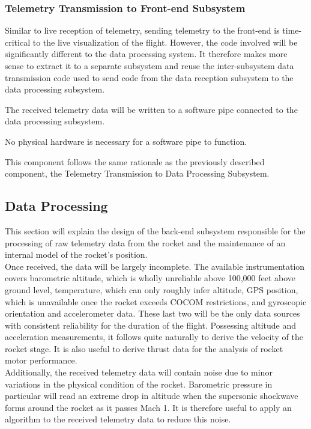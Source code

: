 \documentclass[onecolumn, draftclsnofoot,10pt, compsoc]{IEEEtran}
\begin{document}
\subsubsection{Telemetry Transmission to Front-end Subsystem}
Similar to live reception of telemetry, sending telemetry to the front-end is time-critical to the live visualization of the flight.
However, the code involved will be significantly different to the data processing system.
It therefore makes more sense to extract it to a separate subsystem and reuse the inter-subsystem data transmission code used to send code from the data reception subsystem to the data processing subsystem.

The received telemetry data will be written to a software pipe connected to the data processing subsystem.

No physical hardware is necessary for a software pipe to function.

This component follows the same rationale as the previously described component, the Telemetry Transmission to Data Processing Subsystem.


\subsection{Data Processing}
This section will explain the design of the back-end subsystem responsible for the processing of raw telemetry data from the rocket and the maintenance of an internal model of the rocket's position.\\
\noindent
Once received, the data will be largely incomplete.
The available instrumentation covers barometric altitude, which is wholly unreliable above 100,000 feet above ground level, temperature, which can only roughly infer altitude, GPS position, which is unavailable once the rocket exceeds COCOM restrictions, and gyroscopic orientation and accelerometer data.
These last two will be the only data sources with consistent reliability for the duration of the flight.
Possessing altitude and acceleration measurements, it follows quite naturally to derive the velocity of the rocket stage.
It is also useful to derive thrust data for the analysis of rocket motor performance.\\
\noindent
Additionally, the received telemetry data will contain noise due to minor variations in the physical condition of the rocket.
Barometric pressure in particular will read an extreme drop in altitude when the supersonic shockwave forms around the rocket as it passes Mach 1.
It is therefore useful to apply an algorithm to the received telemetry data to reduce this noise.
\end{document}
